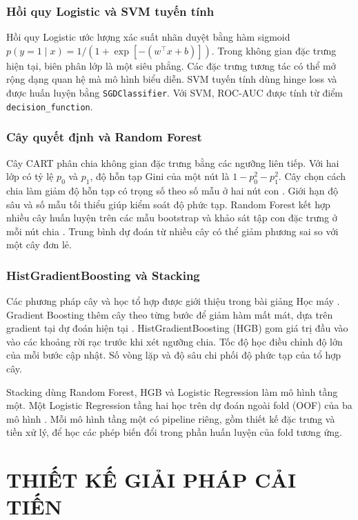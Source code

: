 \documentclass[12pt,a4paper,oneside]{report}
\begin{document}
\subsection{Hồi quy Logistic và SVM tuyến tính}

Hồi quy Logistic ước lượng xác suất nhãn duyệt bằng hàm sigmoid $p(y=1\mid x)=1/(1+\exp[-(w^\top x+b)])$. Trong không gian đặc trưng hiện tại, biên phân lớp là một siêu phẳng. Các đặc trưng tương tác có thể mở rộng dạng quan hệ mà mô hình biểu diễn. SVM tuyến tính dùng hinge loss và được huấn luyện bằng \texttt{SGDClassifier}. Với SVM, ROC-AUC được tính từ điểm \texttt{decision\_function}.

\subsection{Cây quyết định và Random Forest}

Cây CART phân chia không gian đặc trưng bằng các ngưỡng liên tiếp. Với hai lớp có tỷ lệ $p_0$ và $p_1$, độ hỗn tạp Gini của một nút là $1-p_0^2-p_1^2$. Cây chọn cách chia làm giảm độ hỗn tạp có trọng số theo số mẫu ở hai nút con \cite{cart}. Giới hạn độ sâu và số mẫu tối thiểu giúp kiểm soát độ phức tạp. Random Forest kết hợp nhiều cây huấn luyện trên các mẫu bootstrap và khảo sát tập con đặc trưng ở mỗi nút chia \cite{breiman}. Trung bình dự đoán từ nhiều cây có thể giảm phương sai so với một cây đơn lẻ.

\subsection{HistGradientBoosting và Stacking}

Các phương pháp cây và học tổ hợp được giới thiệu trong bài giảng Học máy \cite{course}. Gradient Boosting thêm cây theo từng bước để giảm hàm mất mát, dựa trên gradient tại dự đoán hiện tại \cite{friedman}. HistGradientBoosting (HGB) gom giá trị đầu vào vào các khoảng rời rạc trước khi xét ngưỡng chia. Tốc độ học điều chỉnh độ lớn của mỗi bước cập nhật. Số vòng lặp và độ sâu chi phối độ phức tạp của tổ hợp cây.

Stacking dùng Random Forest, HGB và Logistic Regression làm mô hình tầng một. Một Logistic Regression tầng hai học trên dự đoán ngoài fold (OOF) của ba mô hình \cite{wolpert}. Mỗi mô hình tầng một có pipeline riêng, gồm thiết kế đặc trưng và tiền xử lý, để học các phép biến đổi trong phần huấn luyện của fold tương ứng.

\chapter{THIẾT KẾ GIẢI PHÁP CẢI TIẾN}
\end{document}
